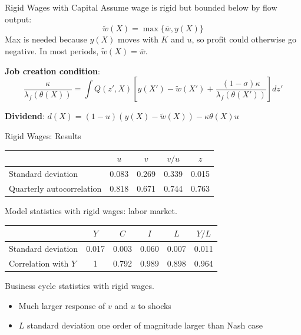 \documentclass[blue]{beamer}
\begin{document}
	\begin{frame}{Rigid Wages with Capital}
		Assume wage is rigid but bounded below by flow output:
		\[
		\tilde{w}(X) = \max\{\bar{w}, y(X)\}
		\]
		Max is needed because $y(X)$ moves with $K$ and $u$, so profit could otherwise go negative. In most periods, $\tilde{w}(X) = \bar{w}$.
		
		\bigskip
		\textbf{Job creation condition}:
		\[
		\frac{\kappa}{\lambda_f(\theta(X))} = \int Q(z', X) \!\left[y(X') - \tilde{w}(X') + \frac{(1 - \sigma) \kappa}{\lambda_f(\theta(X'))}\right] dz'
		\]
		
		\bigskip
		\textbf{Dividend}: $d(X) = (1 - u)(y(X) - \tilde{w}(X)) - \kappa \theta(X) u$
	\end{frame}
	
	\begin{frame}{Rigid Wages: Results}
		\begin{table}
			\centering
			\small
			\begin{tabular}{lcccc}
				\toprule
				& $u$ & $v$ & $v/u$ & $z$ \\
				\midrule
				Standard deviation & 0.083 & 0.269 & 0.339 & 0.015 \\
				Quarterly autocorrelation & 0.818 & 0.671 & 0.744 & 0.763 \\
				\bottomrule
			\end{tabular}
			
			 Model statistics with rigid wages: labor market.
		\end{table}
		
		\begin{table}
			\centering
			\small
			\begin{tabular}{lccccc}
				\toprule
				& $Y$ & $C$ & $I$ & $L$ & $Y/L$ \\
				\midrule
				Standard deviation & 0.017 & 0.003 & 0.060 & 0.007 & 0.011 \\
				Correlation with $Y$ & 1 & 0.792 & 0.989 & 0.898 & 0.964 \\
				\bottomrule
			\end{tabular}
			
			 Business cycle statistics with rigid wages.
		\end{table}
		
		\begin{itemize}
			\item Much larger response of $v$ and $u$ to shocks
			\item $L$ standard deviation one order of magnitude larger than Nash case
		\end{itemize}
	\end{frame}
	
\end{document}
